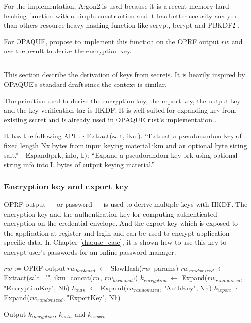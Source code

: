 \documentclass[../report.tex]{subfiles}
\begin{document}
For the implementation, Argon2 is used because it is a recent memory-hard hashing function with a simple construction and it has better security analysis than others resource-heavy hashing function like scrypt, bcrypt and PBKDF2 \cite{CAA}.

For OPAQUE, \cite{OPAQUE_Standard_Draft} propose to implement this function on the OPRF output $rw$ and use the result to derive the encryption key.


\subsection{}

This section describe the derivation of keys from secrets. It is heavily inspired by OPAQUE's standard draft \cite{OPAQUE_Standard_Draft} since the context is similar.


The primitive used to derive the encryption key, the export key, the output key and the key verification tag is HKDF. It is well suited for expanding key from existing secret and is already used in OPAQUE rust's implementation \cite{OPAQUE-KE}.

It has the following API : \cite{OPAQUE_Standard_Draft}
- Extract(salt, ikm): ``Extract a pseudorandom key of fixed length Nx
      bytes from input keying material ikm and an optional byte string
      salt.''
- Expand(prk, info, L): ``Expand a pseudorandom key prk using optional
      string info into L bytes of output keying material.''


\subsubsection{Encryption key and export key}

OPRF output --- or password --- is used to derive multiple keys with HKDF. The encryption key and the authentication key for computing authenticated encryption on the credential envelope. And the export key which is exposed to the application at register and login and can be used to encrypt application specific data. In Chapter \ref{cha:use_case}, it is shown how to use this key to encrypt user's passwords for an online password manager.

\begin{algorithmic}
\Require $rw$ := OPRF output
\State $rw_{hardened}$ $\gets$ SlowHash($rw$, params)
\State $rw_{randomized}$ $\gets$ Extract(salt="", ikm=concat($rw$, $rw_{hardened}$))
\State $k_{encryption}$ $\gets$ Expand($rw_{randomized}$, "EncryptionKey", Nh)
\State $k_{auth}$ $\gets$ Expand($rw_{randomized}$, "AuthKey", Nh)
\State $k_{export}$ $\gets$ Expand($rw_{randomized}$, "ExportKey", Nh)

\State Output $k_{encryption}$, $k_{auth}$ and $k_{export}$
\end{algorithmic}
\end{document}
